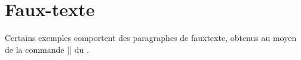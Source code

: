 \section{Faux-texte}
\label{sec-faux-texte}

Certains exemples comportent des paragraphes de \gls{fauxtexte}, obtenus au
moyen de la commande |\lipsum| du .

